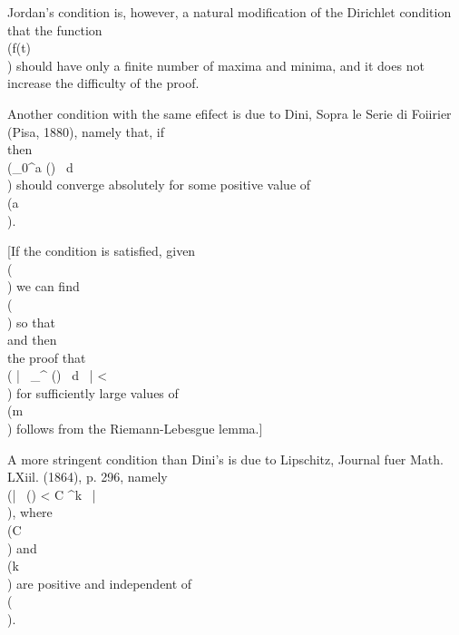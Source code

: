 Jordan's condition is, however, a natural modification of the
Dirichlet condition that the function \\(f(t)\\) should have only a finite
number of maxima and minima, and it does not increase the difficulty
of the proof.

Another condition with the same efifect is due to Dini,
Sopra le Serie di Foiirier (Pisa, 1880),
namely that, if
\\[ 
\Phi(\theta)
=
\left\{
  f(x+2\theta) + f(x-2\theta) - f(x+0) - f(x-0)
\right\}
\theta,
\\] 
then
\\(\int_{0}^{a} \Phi(\theta) \, d \theta\\) should converge absolutely for some positive value of
\\(a\\).

[If the condition is satisfied, given \\(\eps\\) we can find \\(\delta\\) so that
\\[ 
\int_{0}^{\frac{1}{2}\delta}\!
\left| \, 
  \Phi(\theta)
 \, \right| 
\, d \theta
<
\eps,
\\] 
and then
\\[ 
\left| \, 
  \int_{0}^{\frac{1}{2}\delta}\!
  \sin (2m+1)\theta
  \frac{\theta}{\sin \theta}
  \Phi(\theta)
  \, d \theta
 \, \right| 
<
\frac{1}{2} \pi \eps
\\] 
the proof that
\\(
\left| \, 
  \int_{\delta}^{ \pi}\!
  \phi(\theta)
  \, d \theta
 \, \right| 
<
\eps
\\)
for sufficiently large values of \\(m\\)
follows from the Riemann-Lebesgue lemma.]

A more stringent condition than Dini's is due to Lipschitz,
Journal fuer Math. LXiil. (1864), p. 296, %
namely \\(\left| \, \phi(\theta) < C \theta^{k} \, \right| \\), where \\(C\\) and
\\(k\\) are positive and independent of \\(\theta\\).

